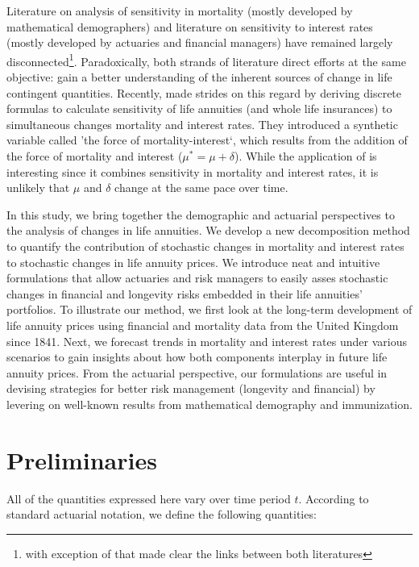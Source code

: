 \documentclass[12pt]{article}
\begin{document}
Literature on analysis of sensitivity in mortality (mostly developed by mathematical demographers) and literature on sensitivity to interest rates (mostly developed by actuaries and financial managers) have remained largely disconnected\footnote{with exception of \citet{Haberman2011} that made clear the links between both literatures}. Paradoxically, both strands of literature direct efforts at the same objective: gain a better understanding of the inherent sources of change in life contingent quantities. Recently, \citet{lin2020natural} made strides on this regard by deriving discrete formulas to calculate sensitivity of life annuities (and whole life insurances) to simultaneous changes mortality and interest rates. They introduced a synthetic variable called 'the force of mortality-interest`, which results from the addition of the force of mortality and interest ($\mu^*=\mu+\delta$). While the application of \citet{lin2020natural} is interesting since it combines sensitivity in mortality and interest rates, it is unlikely that $\mu$ and $\delta$ change at the same pace over time.

In this study, we bring together the demographic and actuarial perspectives to the analysis of changes in life annuities. We develop a new decomposition method to quantify the contribution of stochastic changes in mortality and interest rates to stochastic changes in life annuity prices. We introduce neat and intuitive formulations that allow actuaries and risk managers to easily asses stochastic changes in financial and longevity risks embedded in their life annuities' portfolios. To illustrate our method, we first look at the long-term development of life annuity prices using financial and mortality data from the United Kingdom since 1841. Next, we forecast trends in mortality and interest rates under various scenarios to gain insights about how both components interplay in future life annuity prices. From the actuarial perspective, our formulations are useful in devising strategies for better risk management (longevity and financial) by levering on well-known results from mathematical demography and immunization.






\section{Preliminaries}\label{preliminaries}

All of the quantities expressed here vary over time period $t$. According to standard actuarial notation, we define the following quantities:
\end{document}
